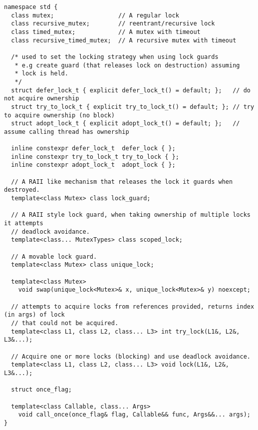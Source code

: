 \begin{verbatim}
namespace std {
  class mutex;                  // A regular lock
  class recursive_mutex;        // reentrant/recursive lock 
  class timed_mutex;            // A mutex with timeout
  class recursive_timed_mutex;  // A recursive mutex with timeout
  
  /* used to set the locking strategy when using lock guards
   * e.g create guard (that releases lock on destruction) assuming 
   * lock is held.
   */
  struct defer_lock_t { explicit defer_lock_t() = default; };   // do not acquire ownership
  struct try_to_lock_t { explicit try_to_lock_t() = default; }; // try to acquire ownership (no block)
  struct adopt_lock_t { explicit adopt_lock_t() = default; };   // assume calling thread has ownership
  
  inline constexpr defer_lock_t  defer_lock { };
  inline constexpr try_to_lock_t try_to_lock { };
  inline constexpr adopt_lock_t  adopt_lock { };
  
  // A RAII like mechanism that releases the lock it guards when destroyed.
  template<class Mutex> class lock_guard;

  // A RAII style lock guard, when taking ownership of multiple locks it attempts 
  // deadlock avoidance.
  template<class... MutexTypes> class scoped_lock;

  // A movable lock guard.
  template<class Mutex> class unique_lock;
  
  template<class Mutex>
    void swap(unique_lock<Mutex>& x, unique_lock<Mutex>& y) noexcept;
  
  // attempts to acquire locks from references provided, returns index (in args) of lock 
  // that could not be acquired.
  template<class L1, class L2, class... L3> int try_lock(L1&, L2&, L3&...);
  
  // Acquire one or more locks (blocking) and use deadlock avoidance.
  template<class L1, class L2, class... L3> void lock(L1&, L2&, L3&...);
  
  struct once_flag;
  
  template<class Callable, class... Args>
    void call_once(once_flag& flag, Callable&& func, Args&&... args);
}
\end{verbatim}
